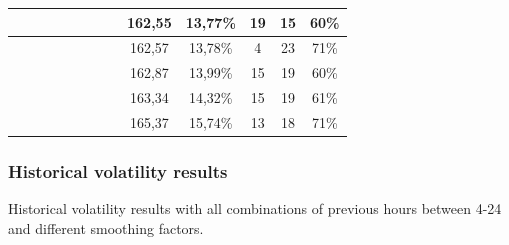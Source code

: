 \begin{center}
\begin{longtable}{|c|c|c|c|c|c|c|c|c|c|c|c|c|}
 \x &  \x &  &  \x &  \x &  &  &  \x & 162,55 & 13,77\% & 19 & 15 & 60\% \\ \hline
 \x &  &  &  \x &  &  \x &  \x &  \x & 162,57 & 13,78\% & 4 & 23 & 71\% \\ \hline
 \x &  &  &  \x &  \x &  &  &  \x & 162,87 & 13,99\% & 15 & 19 & 60\% \\ \hline
 \x &  &  &  \x &  \x &  &  \x &  \x & 163,34 & 14,32\% & 15 & 19 & 61\% \\ \hline
 \x &  &  \x &  \x &  \x &  \x &  &  \x & 165,37 & 15,74\% & 13 & 18 & 71\% \\ \hline
\end{longtable}
\label{table:windProdInputParamsSeasonal}
\end{center}
\normalsize

\subsubsection{Historical volatility results}
\label{sec:historicalVolatiltiyResultsAppendix}
Historical volatility results with all combinations of previous hours between 4-24 and different smoothing factors.

